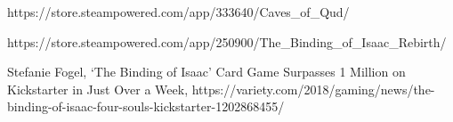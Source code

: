 \documentclass[12pt,twoside]{article}
\begin{document}
\begin{thebibliography}{4}
 https://store.steampowered.com/app/333640/Caves\_of\_Qud/


 https://store.steampowered.com/app/250900/The\_Binding\_of\_Isaac\_Rebirth/

 Stefanie Fogel, ‘The Binding of Isaac’ Card Game Surpasses 1 Million on Kickstarter in Just Over a Week, https://variety.com/2018/gaming/news/the-binding-of-isaac-four-souls-kickstarter-1202868455/



\end{thebibliography}

\clearpage

\makesummary
\end{document}
